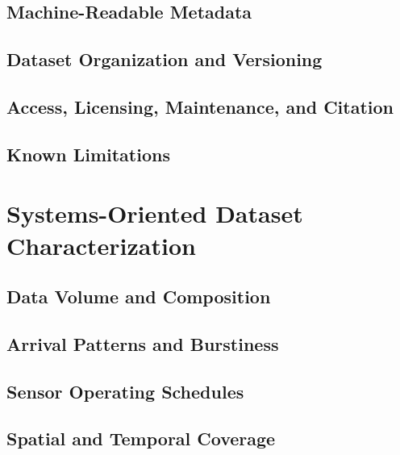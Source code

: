 \documentclass[manuscript]{acmart}
\begin{document}
\subsection{Machine-Readable Metadata}


\subsection{Dataset Organization and Versioning}

\subsection{Access, Licensing, Maintenance, and Citation}

\subsection{Known Limitations}


\newpage
\section{Systems-Oriented Dataset Characterization}
\label{sec:characterization}


\subsection{Data Volume and Composition}

\subsection{Arrival Patterns and Burstiness}

\subsection{Sensor Operating Schedules}

\subsection{Spatial and Temporal Coverage}
\end{document}
